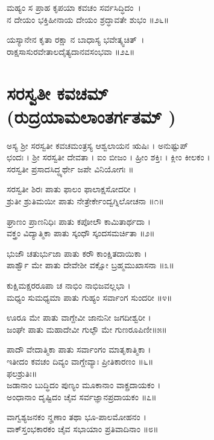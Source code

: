 ಮಹ್ಯಂ ಸ ಪ್ರಾಹ ಕೃಪಯಾ ಕವಚಂ ಸರ್ವಸಿದ್ಧಿದಂ~।\\
ನ ದೇಯಂ ಭಕ್ತಿಹೀನಾಯ ದೇಯಂ ಶ್ರದ್ಧಾವತೇ ಶುಭಂ ॥೨೬॥

ಯಸ್ಯಾನೇನ ಕೃತಾ ರಕ್ಷಾ ನ ಬಾಧಾಸ್ಯ ಭವೇತ್ಕ್ವಚಿತ್~।\\
ರಾಕ್ಷಸಾಸುರವೇತಾಲದೈತ್ಯದಾನವಸಂಭವಾ ॥೨೭॥

\section{ಸರಸ್ವತೀ ಕವಚಮ್\\ (ರುದ್ರಯಾಮಲಾಂತರ್ಗತಮ್ )}

ಅಸ್ಯ ಶ್ರೀ ಸರಸ್ವತೀ ಕವಚಮಂತ್ರಸ್ಯ ಆಶ್ವಲಾಯನ ಋಷಿಃ । ಅನುಷ್ಟುಪ್ \\ಛಂದಃ । ಶ್ರೀ ಸರಸ್ವತೀ ದೇವತಾ । ಐಂ ಬೀಜಂ । ಹ್ರೀಂ ಶಕ್ತಿಃ । ಕ್ಲೀಂ ಕೀಲಕಂ । \\ಸರಸ್ವತೀ ಪ್ರಸಾದಸಿದ್ಧ್ಯರ್ಥೇ ಜಪೇ ವಿನಿಯೋಗಃ ॥



ಸರಸ್ವತೀ ಶಿರಃ ಪಾತು ಫಾಲಂ ಫಾಲಾಕ್ಷಸೋದರೀ ।\\
ಶ್ರುತೀ ಶ್ರುತಿಮಯೀ ಪಾತು ನೇತ್ರೇರ್ಕೇಂದ್ವಗ್ನಿಲೋಚನಾ ॥೧॥

ಘ್ರಾಣಂ ಪ್ರಾಣನಿಧಿಃ ಪಾತು ಕಪೋಲೌ ಕಾಮಿತಾರ್ಥದಾ ।\\
ವಕ್ತ್ರಂ ವಿದ್ಯಾತ್ಮಿಕಾ ಪಾತು ಸ್ಕಂಧೌ ಸ್ಕಂದಸಮರ್ಚಿತಾ ॥೨॥

ಭುಜೌ ಚತುರ್ಭುಜಾ ಪಾತು ಕರೌ ಕಾಂಕ್ಷಿತದಾಯಿಕಾ ।\\
ಪಾರ್ಶ್ವೌ ಮೇ ಪಾತು ದೇವೇಶೀ ವಕ್ಷೋ ಬ್ರಹ್ಮಮುಖಾಸನಾ ॥೩॥

ಕುಕ್ಷಿಮಕ್ಷರರೂಪಾ ಚ ನಾಭಿಂ ನಾಭಿಜವಲ್ಲಭಾ ।\\
ಮಧ್ಯಂ ಸುಮಧ್ಯಮಾ ಪಾತು ಗುಹ್ಯಂ ಸರ್ವಾಂಗ ಸುಂದರೀ ॥೪॥

ಊರೂ ಮೇ ಪಾತು ವಾಗ್ದೇವೀ ಜಾನುನೀ ಜಗದೀಶ್ವರೀ ।\\
ಜಂಘೇ ಪಾತು ಮಹಾದೇವೀ ಗುಲ್ಫೌ ಮೇ ಗುಣರೂಪಿಣೀ॥೫॥

ಪಾದೌ ವೇದಾತ್ಮಿಕಾ ಪಾತು ಸರ್ವಾಂಗಂ ಮಾತೃಕಾತ್ಮಿಕಾ ।\\
ಇತೀದಂ ಕವಚಂ ದಿವ್ಯಂ ವಾಗ್ದೇವ್ಯಾಃ ಪ್ರೀತಿಕಾರಣಂ ॥೬॥\\
ಫಲಶ್ರುತಿಃ॥\\
ಜಡಾನಾಂ ಬುದ್ಧಿದಂ ಪುಣ್ಯಂ ಮೂಕಾನಾಂ ವಾಕ್ಪ್ರದಾಯಕಂ ।\\
ಅಂಧಾನಾಂ ದೃಷ್ಟಿದಂ ಚೈವ ಸರ್ವಜ್ಞಾನಪ್ರದಾಯಕಂ ॥೭॥

ವಾಗ್ವಶ್ಯಜನಕಂ ನೄಣಾಂ ತಥಾ ಭೂ-ಪಾಲಮೋಹನಂ ।\\
ವಾಕ್‌ಸ್ತಂಭಕಾರಕಂ ಚೈವ ಸಭಾಯಾಂ ಪ್ರತಿವಾದಿನಾಂ ॥೮॥

